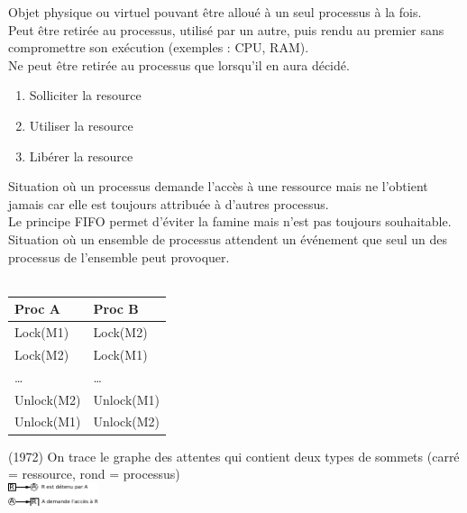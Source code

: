  Objet physique ou virtuel pouvant être alloué à un seul processus à la fois.\\

 Peut être retirée au processus, utilisé par un autre, puis rendu au premier sans compromettre son exécution (exemples : CPU, RAM). \\

 Ne peut être retirée au processus que lorsqu'il en aura décidé. \\

\begin{enumerate}
	\item Solliciter la resource
	\item Utiliser la resource
	\item Libérer la resource
\end{enumerate}

 Situation où un processus demande l'accès à une ressource mais ne l'obtient jamais car elle est toujours attribuée à d'autres processus.\\

 Le principe FIFO permet d'éviter la famine mais n'est pas toujours souhaitable. \\

 Situation où un ensemble de processus attendent un événement que seul un des processus de l'ensemble peut provoquer.\\

\\
\begin{tabular}{l|l}
Proc A & Proc B \\ \hline
Lock(M1) & Lock(M2) \\ 
Lock(M2) & Lock(M1) \\
\ldots & \ldots \\
Unlock(M2) & Unlock(M1) \\
Unlock(M1) & Unlock(M2) \\
\end{tabular}

 (1972) On trace le graphe des attentes qui contient deux types de sommets (carré = ressource, rond = processus) \\
\includegraphics[width=100px]{fig37.pdf}\\

